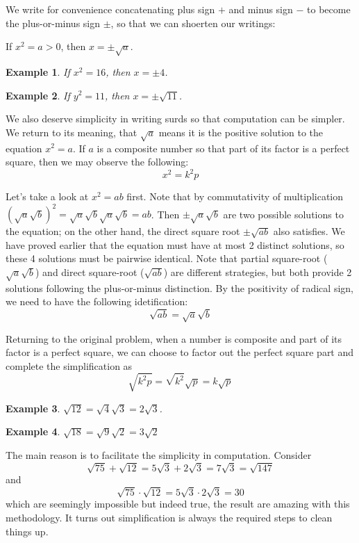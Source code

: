 \documentclass[12pt]{article}
\newtheorem*{example}{Example}
\begin{document}
    We write for convenience concatenating plus sign $+$ and minus sign $-$ to become the plus-or-minus sign $\pm$, so that we can shoerten our writings:

    If $x^2=a>0$, then $x=\pm \sqrt{a}$.
    
    \begin{example}
        If $x^2=16$, then $x=\pm 4$.
    \end{example}

    \begin{example}
        If $y^2=11$, then $x=\pm \sqrt{11}$.
    \end{example}

    We also deserve simplicity in writing surds so that computation can be simpler. We return to its meaning, that $\sqrt{a}$ means it is the positive solution to the equation $x^2=a$. If $a$ is a composite number so that part of its factor is a perfect square, then we may observe the following: $$x^2=k^2 p$$

    Let's take a look at $x^2=ab$ first. Note that by commutativity of multiplication $(\sqrt{a}\sqrt{b})^2=\sqrt{a}\sqrt{b}\sqrt{a}\sqrt{b}=ab$. Then $\pm\sqrt{a}\sqrt{b}$ are two possible solutions to the equation; on the other hand, the direct square root $\pm\sqrt{ab}$ also satisfies. We have proved earlier that the equation must have at most 2 distinct solutions, so these 4 solutions must be pairwise identical. Note that partial square-root ($\sqrt{a}\sqrt{b}$) and direct square-root ($\sqrt{ab}$) are different strategies, but both provide 2 solutions following the plus-or-minus distinction. By the positivity of radical sign, we need to have the following idetification: \[\sqrt{ab}=\sqrt{a}\sqrt{b}\]

    Returning to the original problem, when a number is composite and part of its factor is a perfect square, we can choose to factor out the perfect square part and complete the simplification as \[\sqrt{k^2 p}=\sqrt{k^2}\sqrt{p}=k\sqrt{p}\]

    \begin{example}
        $\sqrt{12}=\sqrt{4}\sqrt{3}=2\sqrt{3}$.
    \end{example}

    \begin{example}
        $\sqrt{18}=\sqrt{9}\sqrt{2}=3\sqrt{2}$
    \end{example}

    The main reason is to facilitate the simplicity in computation. Consider \[\sqrt{75}+\sqrt{12}=5\sqrt{3}+2\sqrt{3}=7\sqrt{3}=\sqrt{147}\] and \[\sqrt{75}\cdot \sqrt{12}=5\sqrt{3}\cdot 2\sqrt{3}=30\] which are seemingly impossible but indeed true, the result are amazing with this methodology. It turns out simplification is always the required steps to clean things up.
\end{document}
